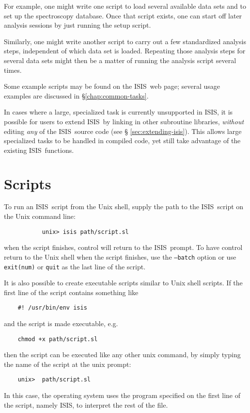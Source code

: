 \documentclass{book}
\newcommand{\isisx}{{\sc ISIS~}}
\newcommand{\isis}{{\sc ISIS}}
\begin{document}
{For example, one might write one script to load several available data
sets and to set up the spectroscopy database.  Once that script exists,
one can start off later analysis sessions by just running the setup
script.

Similarly, one might write another script to carry out a few standardized
analysis steps, independent of which data set is loaded.  Repeating those
analysis steps for several data sets might then be a matter of running the
analysis script several times.

Some example scripts may be found on the \isisx web page; several
usage examples are discussed in \S\ref{chap:common-tasks}.

In cases where a large, specialized task is currently unsupported in \isis,
it is possible for users to extend \isisx by linking in other subroutine
libraries, {\it without} editing {\it any} of the \isisx source code (see \S
\ref{sec:extending-isis}). This allows large specialized tasks to be handled
in compiled code, yet still take advantage of the existing \isisx functions.

\section{Scripts}
\label{sec:scripts}

To run an \isisx script from the Unix shell, supply the path to the
\isisx script on the Unix command line:
\begin{verbatim}
           unix> isis path/script.sl
\end{verbatim}
when the script finishes, control will return to the
\isisx prompt.  To have control return to the Unix shell when
the script finishes, use the {\tt --batch} option or use
{\tt exit(num)} or {\tt quit} as the last line of the script.

It is also possible to create executable scripts similar to Unix
shell scripts.  If the first line of the script contains
something like
\begin{verbatim}
    #! /usr/bin/env isis
\end{verbatim}
and the script is made executable, e.g.
\begin{verbatim}
    chmod +x path/script.sl
\end{verbatim}
then the script can be executed like any other unix command,
by simply typing the name of the script at the unix prompt:
\begin{verbatim}
    unix>  path/script.sl
\end{verbatim}
In this case, the operating system uses the program specified
on the first line of the script, namely \isis, to interpret
the rest of the file.

}
\end{document}
